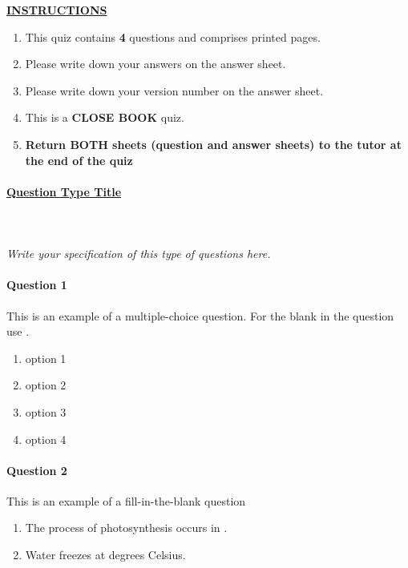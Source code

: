 \documentclass[a4paper,12pt,fleqn]{article}
\newcommand{\questionnumber}{4}
\begin{document}
\noindent\underline{\bf INSTRUCTIONS}
\vspace{0.25cm}


\begin{enumerate}
\item This quiz contains {\bf \questionnumber} questions and comprises 
{\bf \pageref{finalpage}} printed pages.
\item Please write down your answers on the answer sheet. 
\item Please write down your version number on the answer sheet.
\item This is a {\bf CLOSE BOOK} quiz.
\item {\bf Return BOTH sheets (question and answer sheets) to the tutor at the end of the quiz}
\end{enumerate}



\newpage
\paragraph{\textbf{\underline{Question Type Title}}}

~\\~\\ \textit{Write your specification of this type of questions here.}

\bigskip
\paragraph{\textbf{Question 1}}
This is an example of a multiple-choice question. For the blank in the question use \underline{\hspace{2cm}}.  
\begin{enumerate}[label=\alph*.]
    \item option 1
    \item option 2
    \item option 3
    \item option 4
\end{enumerate}

\newpage
\paragraph{\textbf{Question 2}}
This is an example of a fill-in-the-blank question
\begin{enumerate}
    \item The process of photosynthesis occurs in \underline{\hspace{5cm}}.
    \item Water freezes at \underline{\hspace{2cm}} degrees Celsius.
\end{enumerate}
\end{document}

